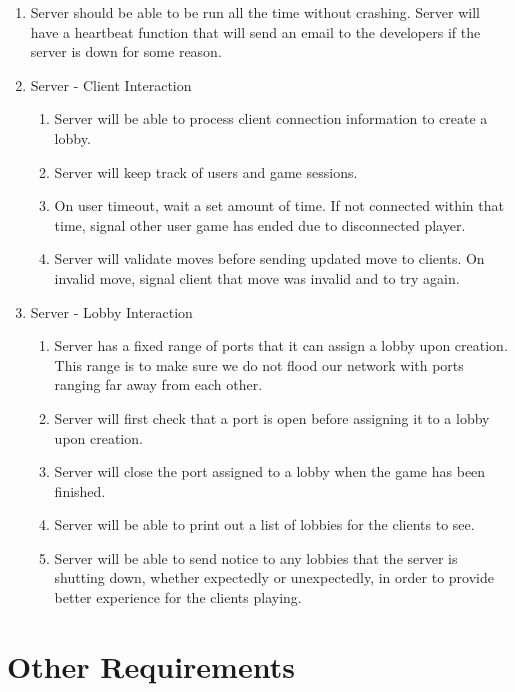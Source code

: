 \documentclass{scrreprt}
\begin{document}
\begin{enumerate}[resume*]
    \item Server should be able to be run all the time without crashing.
        \subitem Server will have a heartbeat function that will send an email to the developers if the server is down for some reason.
    \item Server - Client Interaction
    \begin{enumerate}[label*=\arabic*.]
        \item Server will be able to process client connection information to create a lobby.
        \item Server will keep track of users and game sessions.
        \item On user timeout, wait a set amount of time.
            \subitem If not connected within that time, signal other user game has ended due to disconnected player.
        \item Server will validate moves before sending updated move to clients.
            \subitem On invalid move, signal client that move was invalid and to try again.
    \end{enumerate}
    \item Server - Lobby Interaction
    \begin{enumerate}[label*=\arabic*.]
        \item Server has a fixed range of ports that it can assign a lobby upon creation. This range is to make sure we do not flood our network with ports ranging far away from each other.
        \item Server will first check that a port is open before assigning it to a lobby upon creation.
        \item Server will close the port assigned to a lobby when the game has been finished.
        \item Server will be able to print out a list of lobbies for the clients to see.
        \item Server will be able to send notice to any lobbies that the server is shutting down, whether expectedly or unexpectedly, in order to provide better experience for the clients playing.   
    \end{enumerate}
\end{enumerate}

\chapter{Other Requirements}
\end{document}
